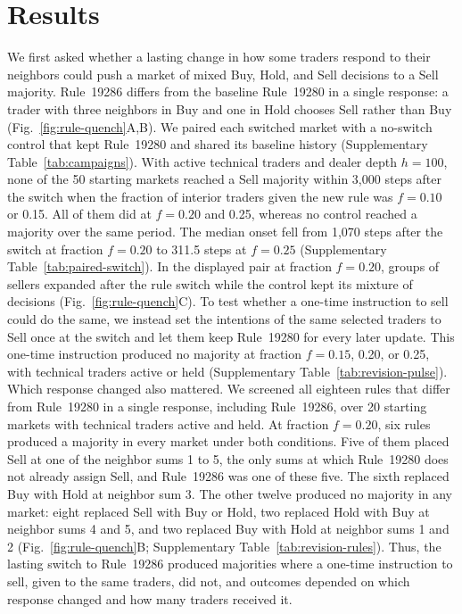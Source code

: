 \section{Results}

We first asked whether a lasting change in how some traders respond to
their neighbors could push a market of mixed Buy, Hold, and Sell
decisions to a Sell majority.
Rule~19286 differs from the baseline Rule~19280 in a single response:
a trader with three neighbors in Buy and one in Hold chooses Sell rather
than Buy (Fig.~\ref{fig:rule-quench}A,B). We paired each switched market
with a no-switch control that kept Rule~19280 and shared its baseline
history (Supplementary
Table~\ref{tab:campaigns}). With active technical traders and dealer
depth $h=100$, none of the 50 starting markets reached a Sell majority
within 3,000 steps after the switch when the fraction of interior
traders given the new rule was $f=0.10$ or 0.15. All of them did at
$f=0.20$ and 0.25, whereas no control reached a majority over the same
period. The median onset fell from 1,070 steps after the switch at
fraction $f=0.20$ to 311.5 steps at $f=0.25$
(Supplementary Table~\ref{tab:paired-switch}). In the displayed pair at
fraction $f=0.20$, groups of sellers expanded after the rule switch
while the control kept its mixture of decisions
(Fig.~\ref{fig:rule-quench}C). To test whether a one-time instruction to
sell could do the same, we instead set the intentions of the same
selected traders to Sell once at the switch and let them keep
Rule~19280 for every later update. This one-time
instruction produced no majority at fraction $f=0.15$, 0.20, or 0.25,
with technical traders active or held
(Supplementary Table~\ref{tab:revision-pulse}). Which response changed
also mattered. We screened all eighteen rules that differ from
Rule~19280 in a single response, including Rule~19286, over 20 starting
markets with technical traders active and held. At fraction $f=0.20$,
six rules produced a majority in every market under both conditions.
Five of them placed Sell at one of the neighbor sums 1 to 5, the only sums
at which Rule~19280 does not already assign Sell, and Rule~19286 was one
of these five. The sixth replaced Buy with Hold at neighbor sum 3. The other twelve produced no majority in any market: eight replaced
Sell with Buy or Hold, two replaced Hold with Buy at neighbor sums 4
and 5, and two replaced Buy with Hold at neighbor sums 1 and 2
(Fig.~\ref{fig:rule-quench}B;
Supplementary Table~\ref{tab:revision-rules}). Thus, the lasting
switch to Rule~19286 produced majorities where a one-time
instruction to sell, given to the same traders, did not, and outcomes depended on which
response changed and how many traders received it.

